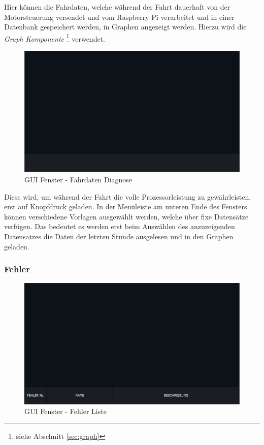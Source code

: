 Hier können die Fahrdaten, welche während der Fahrt dauerhaft von der Motorsteuerung versendet und vom Raspberry Pi verarbeitet und in einer Datenbank gespeichert werden, in Graphen angezeigt werden. Hierzu wird die \textit{Graph Komponente} \footnote{siehe Abschnitt \ref{sec:graph}} verwendet.
\begin{figure}[H]
	\begin{center}
		\includegraphics[scale=0.25]{figures/hcis/window_diagnosis.png}
			\caption{GUI Fenster - Fahrdaten Diagnose}
			\label{fig:pageDiagnose}
	\end{center}
\end{figure}

 Diese wird, um während der Fahrt die volle Prozessorleistung zu gewährleisten, erst auf Knopfdruck geladen. In der Menüleiste am unteren Ende des Fensters können verschiedene Vorlagen ausgewählt werden, welche über fixe Datensätze verfügen. Das bedeutet es werden erst beim Auswählen des anzuzeigenden Datensatzes die Daten der letzten Stunde ausgelesen und in den Graphen geladen.


\newpage

\subsubsection{Fehler}

\begin{figure}[H]
	\begin{center}
		\includegraphics[scale=0.25]{figures/hcis/window_error.png}
			\caption{GUI Fenster - Fehler Liste}
			\label{fig:pageError}
	\end{center}
\end{figure}

